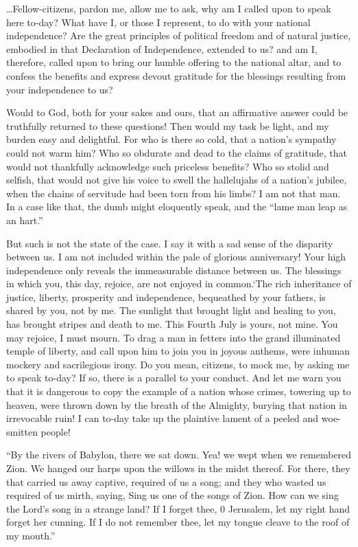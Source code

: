\documentclass[a4paper]{amsbook}
\begin{document}
…Fellow-citizens, pardon me, allow me to ask, why am I called upon to speak here to-day? What have I, or those I represent, to do with your national independence? Are the great principles of political freedom and of natural justice, embodied in that Declaration of Independence, extended to us? and am I, therefore, called upon to bring our humble offering to the national altar, and to confess the benefits and express devout gratitude for the blessings resulting from your independence to us?

Would to God, both for your sakes and ours, that an affirmative answer could be truthfully returned to these questions! Then would my task be light, and my burden easy and delightful. For who is there so cold, that a nation's sympathy could not warm him? Who so obdurate and dead to the claims of gratitude, that would not thankfully acknowledge such priceless benefits? Who so stolid and selfish, that would not give his voice to swell the hallelujahs of a nation's jubilee, when the chains of servitude had been torn from his limbs? I am not that man. In a case like that, the dumb might eloquently speak, and the “lame man leap as an hart.”

But such is not the state of the case. I say it with a sad sense of the disparity between us. I am not included within the pale of glorious anniversary! Your high independence only reveals the immeasurable distance between us. The blessings in which you, this day, rejoice, are not enjoyed in common.‘The rich inheritance of justice, liberty, prosperity and independence, bequeathed by your fathers, is shared by you, not by me. The sunlight that brought light and healing to you, has brought stripes and death to me. This Fourth July is yours, not mine. You may rejoice, I must mourn. To drag a man in fetters into the grand illuminated temple of liberty, and call upon him to join you in joyous anthems, were inhuman mockery and sacrilegious irony. Do you mean, citizens, to mock me, by asking me to speak to-day? If so, there is a parallel to your conduct. And let me warn you that it is dangerous to copy the example of a nation whose crimes, towering up to heaven, were thrown down by the breath of the Almighty, burying that nation in irrevocable ruin! I can to-day take up the plaintive lament of a peeled and woe-smitten people!

“By the rivers of Babylon, there we sat down. Yea! we wept when we remembered Zion. We hanged our harps upon the willows in the midst thereof. For there, they that carried us away captive, required of us a song; and they who wasted us required of us mirth, saying, Sing us one of the songs of Zion. How can we sing the Lord's song in a strange land? If I forget thee, 0 Jerusalem, let my right hand forget her cunning. If I do not remember thee, let my tongue cleave to the roof of my mouth.”
\end{document}
